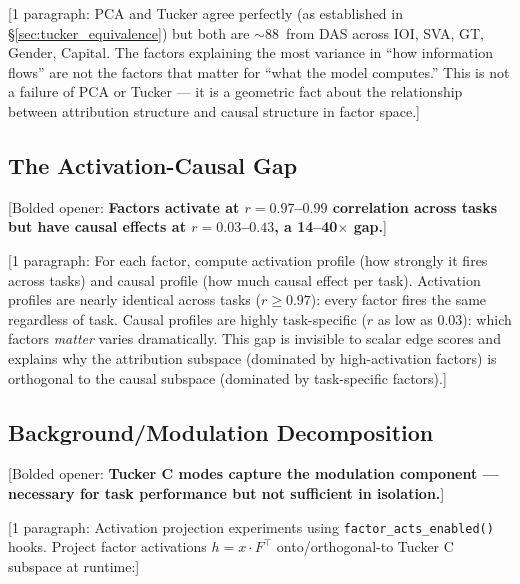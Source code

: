 \documentclass[11pt]{article}
\begin{document}
[1 paragraph: PCA and Tucker agree perfectly (as established in
\S\ref{sec:tucker_equivalence}) but both are $\sim$88\textdegree\ from
DAS across IOI, SVA, GT, Gender, Capital. The factors explaining the
most variance in ``how information flows'' are not the factors that
matter for ``what the model computes.'' This is not a failure of PCA
or Tucker --- it is a geometric fact about the relationship between
attribution structure and causal structure in factor space.]

\subsection{The Activation-Causal Gap}


[Bolded opener: \textbf{Factors activate at $r = 0.97$--$0.99$
correlation across tasks but have causal effects at $r = 0.03$--$0.43$,
a 14--40$\times$ gap.}]

[1 paragraph: For each factor, compute activation profile (how strongly
it fires across tasks) and causal profile (how much causal effect per
task). Activation profiles are nearly identical across tasks
($r \geq 0.97$): every factor fires the same regardless of task.
Causal profiles are highly task-specific ($r$ as low as 0.03): which
factors \emph{matter} varies dramatically. This gap is invisible to
scalar edge scores and explains why the attribution subspace (dominated
by high-activation factors) is orthogonal to the causal subspace
(dominated by task-specific factors).]

\subsection{Background/Modulation Decomposition}


[Bolded opener: \textbf{Tucker C modes capture the modulation
component --- necessary for task performance but not sufficient in
isolation.}]

[1 paragraph: Activation projection experiments using
\texttt{factor\_acts\_enabled()} hooks. Project factor activations
$h = x \cdot F^\top$ onto/orthogonal-to Tucker C subspace at runtime:]
\end{document}
